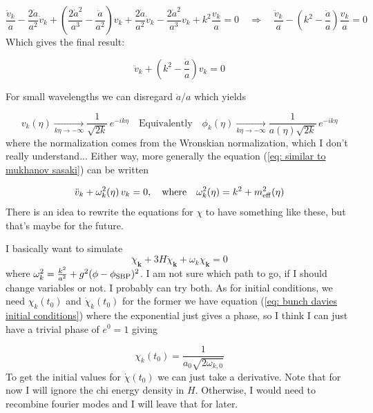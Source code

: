 \begin{equation*}
    \frac{\ddot{v}_k}{a} - \frac{2\dot{a}}{a^2}\dot{v}_k + \left(\frac{2\dot{a}^2}{a^3} - \frac{\ddot{a}}{a^2}\right)v_k + \frac{2\dot{a}}{a^2}\dot{v}_k - \frac{2\dot{a}^2}{a^3}v_k + k^2\frac{v_k}{a} = 0 \quad \Rightarrow \quad \frac{\ddot{v}_k}{a} - \left(k^2 - \frac{\ddot{a}}{a}\right)\frac{v_k}{a} = 0
\end{equation*}
Which gives the final result:

\begin{equation}\label{eq: similar to mukhanov sasaki}
    \ddot{v}_k + \left(k^2 - \frac{\ddot{a}}{a}\right)v_k = 0
\end{equation}

For small wavelengths we can disregard $\ddot{a}/a$ which yields

\begin{equation*}
    v_k(\eta) \xrightarrow[k\eta \to -\infty]{} \frac{1}{\sqrt{2k}}\,e^{-ik\eta} \quad \text{Equivalently} \quad \phi_k(\eta) \xrightarrow[k\eta \to -\infty]{} \frac{1}{a(\eta)\sqrt{2k}}\,e^{-ik\eta}
\end{equation*}
where the normalization comes from the Wronskian normalization, which I don't really understand... Either way, more generally the equation (\ref{eq: similar to mukhanov sasaki}) can be written

\begin{equation*}
    \ddot{v}_k + \omega_k^2(\eta)\,v_k = 0, \quad \text{where} \quad \omega_k^2(\eta) = k^2 + m_{\rm eff}^2(\eta)
\end{equation*}
There is an idea to rewrite the equations for $\chi$ to have something like these, but that's maybe for the future.

I basically want to simulate
\begin{equation*}
    \ddot{\chi}_{\bm{k}} + 3H \dot{\chi}_{\bm{k}} + \omega_{k} \chi_{\bm{k}} = 0
\end{equation*}
where $\omega_{k}^2 = \frac{k^2}{a^2} + g^2 (\phi - \phi_{\rm SBP})^2$. I am not sure which path to go, if I should change variables or not. I probably can try both. As for initial conditions, we need $\chi_k(t_0)$ and $\dot{\chi}_{k}(t_0)$ for the former we have equation (\ref{eq: bunch davies initial conditions}) where the exponential just gives a phase, so I think I can just have a trivial phase of $e^{0} = 1$ giving

\begin{equation}\label{eq: initial condition chi}
    \chi_k(t_0) = \frac{1}{a_0 \sqrt{2 \omega_{k,0}}}
\end{equation}
To get the initial values for $\dot{\chi}(t_0)$ we can just take a derivative. Note that for now I will ignore the chi energy density in $H$. Otherwise, I would need to recombine fourier modes and I will leave that for later. 

